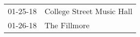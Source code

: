 \begin{supertabular}{p{0.25\columnwidth}p{0.75\columnwidth}}
 01-25-18 &  College Street Music Hall \\
 01-26-18 &               The Fillmore \\
\end{supertabular}
